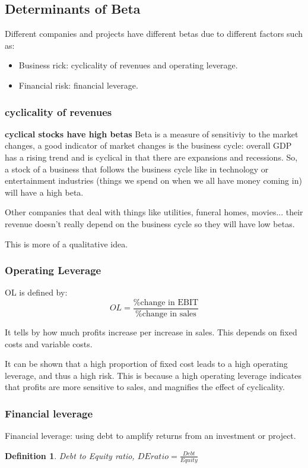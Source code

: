 \documentclass{article}
\newtheorem{definition}{Definition}
\begin{document}
\subsection{Determinants of Beta}
Different companies and projects have different betas due to different factors such as: 
\begin{itemize}
\item Business rick: cyclicality of revenues and operating leverage. 
\item Financial risk: financial leverage.
\end{itemize}

\subsubsection{cyclicality of revenues}
\textbf{cyclical stocks have high betas}
Beta is a measure of sensitiviy to the market changes, a good indicator of market changes is the business cycle: overall GDP has a rising trend and is cyclical in that there are expansions and recessions. So, a stock of a business that follows the business cycle like in technology or entertainment industries (things we spend on when we all have money coming in) will have a high beta.

Other companies that deal with things like utilities, funeral homes, movies... their revenue doesn't really depend on the business cycle so they  will have low betas.

This is more of a qualitative idea. 

\subsubsection{Operating Leverage}
 OL is defined by:
 \[ OL = \frac{\text{\% change in EBIT}}{\text{\% change in sales}}\]
 
 It tells by how much profits increase per increase in sales. This depends on fixed costs and variable costs. 
 
 It can be shown that a high proportion of fixed cost leads to a high operating leverage, and thus a high risk. This is because a high operating leverage indicates that profits are more sensitive to sales, and magnifies the effect of cyclicality. 

\subsubsection{Financial leverage}
Financial leverage: using debt to amplify returns from an investment or project. 
 \begin{definition}
 Debt to Equity ratio, $ DE ratio= \frac{Debt}{Equity}$
 \end{definition}
 
\end{document}
